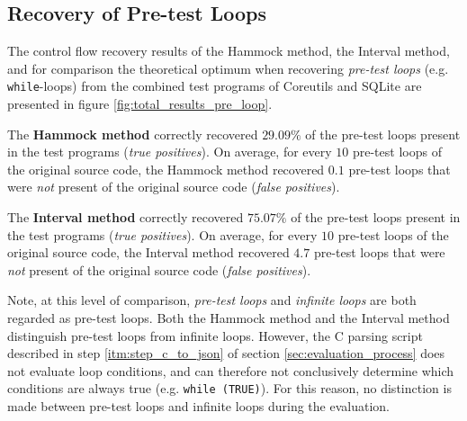 
\subsection{Recovery of Pre-test Loops}
\label{sec:recovery_of_pre_test_loops}

The control flow recovery results of the Hammock method, the Interval method, and for comparison the theoretical optimum when recovering \textit{pre-test loops} (e.g. \texttt{while}-loops) from the combined test programs of Coreutils and SQLite are presented in figure \ref{fig:total_results_pre_loop}.

The \textbf{Hammock method} correctly recovered $29.09\%$ of the pre-test loops present in the test programs (\textit{true positives}). On average, for every $10$ pre-test loops of the original source code, the Hammock method recovered $0.1$ pre-test loops that were \textit{not} present of the original source code (\textit{false positives}).

The \textbf{Interval method} correctly recovered $75.07\%$ of the pre-test loops present in the test programs (\textit{true positives}). On average, for every $10$ pre-test loops of the original source code, the Interval method recovered $4.7$ pre-test loops that were \textit{not} present of the original source code (\textit{false positives}).

Note, at this level of comparison, \textit{pre-test loops} and \textit{infinite loops} are both regarded as pre-test loops. Both the Hammock method and the Interval method distinguish pre-test loops from infinite loops. However, the C parsing script described in step \ref{itm:step_c_to_json} of section \ref{sec:evaluation_process} does not evaluate loop conditions, and can therefore not conclusively determine which conditions are always true (e.g. \texttt{while (TRUE)}). For this reason, no distinction is made between pre-test loops and infinite loops during the evaluation.

